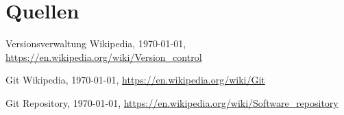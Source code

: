 \section{Quellen}
\begin{thebibliography}{9}

  Versionsverwaltung Wikipedia,
  \today,
  \url{https://en.wikipedia.org/wiki/Version_control}

  Git Wikipedia,
  \today,
  \url{https://en.wikipedia.org/wiki/Git}

  Git Repository,
  \today,
  \url{https://en.wikipedia.org/wiki/Software_repository}

\end{thebibliography}
